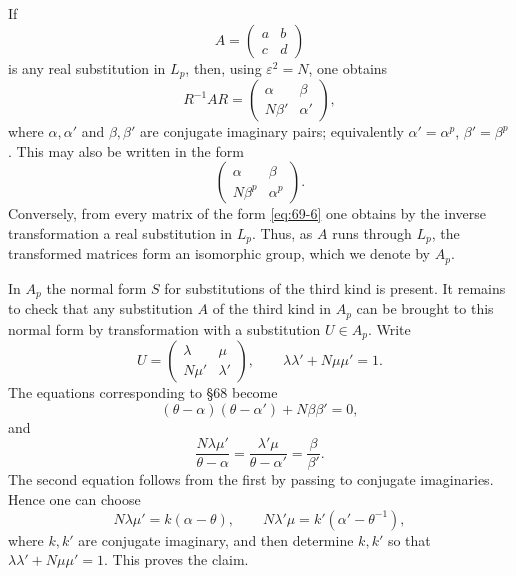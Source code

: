 \documentclass[11pt]{article}
\begin{document}
If
\[
 A=\begin{pmatrix}a&b\\c&d\end{pmatrix}
\]
is any real substitution in \(L_p\), then, using \(\varepsilon^2=N\), one obtains
\begin{equation}\label{eq:69-5}
 R^{-1}AR=
 \begin{pmatrix}
 \alpha&\beta\\
 N\beta'&\alpha'
 \end{pmatrix},
\end{equation}
where \(\alpha,\alpha'\) and \(\beta,\beta'\) are conjugate imaginary pairs; equivalently \(\alpha'=\alpha^p\), \(\beta'=\beta^p\).  This may also be written in the form
\begin{equation}\label{eq:69-6}
 \begin{pmatrix}
 \alpha&\beta\\
 N\beta^p&\alpha^p
 \end{pmatrix}.
\end{equation}
Conversely, from every matrix of the form \eqref{eq:69-6} one obtains by the inverse transformation a real substitution in \(L_p\).  Thus, as \(A\) runs through \(L_p\), the transformed matrices form an isomorphic group, which we denote by \(A_p\).

In \(A_p\) the normal form \(S\) for substitutions of the third kind is present.  It remains to check that any substitution \(A\) of the third kind in \(A_p\) can be brought to this normal form by transformation with a substitution \(U\in A_p\).  Write
\begin{equation}\label{eq:69-8}
 U=\begin{pmatrix}\lambda&\mu\\N\mu'&\lambda'\end{pmatrix},
 \qquad
 \lambda\lambda'+N\mu\mu'=1.
\end{equation}
The equations corresponding to \S 68 become
\begin{equation}\label{eq:69-10}
 (\theta-\alpha)(\theta-\alpha')+N\beta\beta'=0,
\end{equation}
and
\begin{equation}\label{eq:69-11}
 \frac{N\lambda\mu'}{\theta-\alpha}=\frac{\lambda'\mu}{\theta-\alpha'}=\frac{\beta}{\beta'}.
\end{equation}
The second equation follows from the first by passing to conjugate imaginaries.  Hence one can choose
\[
 N\lambda\mu'=k(\alpha-\theta),
 \qquad
 N\lambda'\mu=k'(\alpha'-\theta^{-1}),
\]
where \(k,k'\) are conjugate imaginary, and then determine \(k,k'\) so that \(\lambda\lambda'+N\mu\mu'=1\).  This proves the claim.
\end{document}
